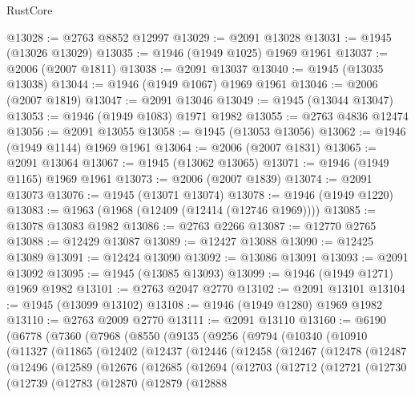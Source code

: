 \begin{lexlean}{RustCore}
\begin{coremodule}
@13028 := @2763 @8852 @12997
@13029 := @2091 @13028
@13031 := @1945 (@13026 @13029)
@13035 := @1946 (@1949 @1025) @1969 @1961
@13037 := @2006 (@2007 @1811)
@13038 := @2091 @13037
@13040 := @1945 (@13035 @13038)
@13044 := @1946 (@1949 @1067) @1969 @1961
@13046 := @2006 (@2007 @1819)
@13047 := @2091 @13046
@13049 := @1945 (@13044 @13047)
@13053 := @1946 (@1949 @1083) @1971 @1982
@13055 := @2763 @4836 @12474
@13056 := @2091 @13055
@13058 := @1945 (@13053 @13056)
@13062 := @1946 (@1949 @1144) @1969 @1961
@13064 := @2006 (@2007 @1831)
@13065 := @2091 @13064
@13067 := @1945 (@13062 @13065)
@13071 := @1946 (@1949 @1165) @1969 @1961
@13073 := @2006 (@2007 @1839)
@13074 := @2091 @13073
@13076 := @1945 (@13071 @13074)
@13078 := @1946 (@1949 @1220)
@13083 := @1963 (@1968 (@12409 (@12414 (@12746 @1969))))
@13085 := @13078 @13083 @1982
@13086 := @2763 @2266
@13087 := @12770 @2765
@13088 := @12429 @13087
@13089 := @12427 @13088
@13090 := @12425 @13089
@13091 := @12424 @13090
@13092 := @13086 @13091
@13093 := @2091 @13092
@13095 := @1945 (@13085 @13093)
@13099 := @1946 (@1949 @1271) @1969 @1982
@13101 := @2763 @2047 @2770
@13102 := @2091 @13101
@13104 := @1945 (@13099 @13102)
@13108 := @1946 (@1949 @1280) @1969 @1982
@13110 := @2763 @2009 @2770
@13111 := @2091 @13110
@13160 := @6190
    (@6778
      (@7360
        (@7968
          (@8550
            (@9135
              (@9256
                (@9794
                  (@10340
                    (@10910
                      (@11327
                        (@11865
                          (@12402
                            (@12437
                              (@12446
                                (@12458
                                  (@12467
                                    (@12478
                                      (@12487
                                        (@12496
                                          (@12589
                                            (@12676
                                              (@12685
                                                (@12694
                                                  (@12703
                                                    (@12712
                                                      (@12721
                                                        (@12730
                                                          (@12739
                                                            (@12783
                                                              (@12870
                                                                (@12879
                                                                  (@12888

\end{coremodule}
\end{lexlean}
